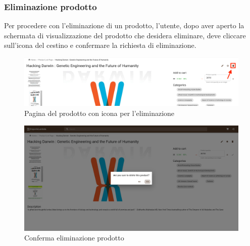 \subsubsection{Eliminazione prodotto}
Per procedere con l'eliminazione di un prodotto, l'utente, dopo aver aperto la schermata di visualizzazione del prodotto che desidera eliminare, deve cliccare sull'icona del cestino e confermare la richiesta di eliminazione.
\begin{figure}[H]
	\centering
	\includegraphics[scale=0.25]{Immagini/Venditore/pdp.sellerdelete.png}
	\caption{Pagina del prodotto con icona per l'eliminazione}
	\label{fig:EliminaP}
\end{figure}
\begin{figure}[H]
	\centering
	\includegraphics[scale=0.25]{Immagini/Venditore/pdp-remove.seller.png}
	\caption{Conferma eliminazione prodotto}
	\label{fig:EliminazioneProdotto}
\end{figure}
